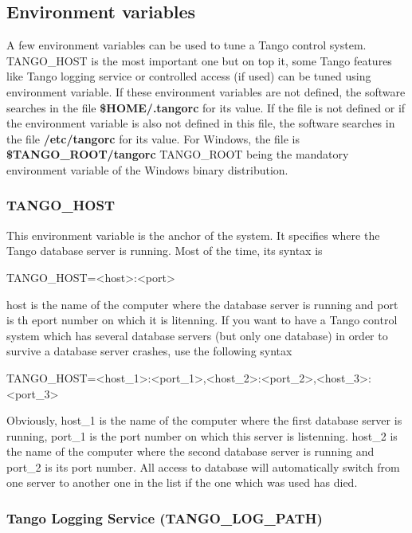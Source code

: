 \subsection{Environment variables}

A few environment variables can be used to tune a Tango control system.
TANGO\_HOST is the most important one but on top
it, some Tango features like Tango logging service or controlled access
(if used) can be tuned using environment variable. If these environment
variables are not defined, the software searches in the file \textbf{\$HOME/.tangorc}
for its value. If the file is not defined or if the environment variable
is also not defined in this file, the software searches in the file
\textbf{/etc/tangorc} for its value. For Windows,
the file is \textbf{\$TANGO\_ROOT/tangorc} TANGO\_ROOT
being the mandatory environment variable of the Windows binary distribution.


\subsubsection{TANGO\_HOST}

This environment variable is the anchor of the system. It specifies
where the Tango database server is running. Most of the time, its
syntax is\begin{center}TANGO\_HOST=<host>:<port>\end{center}host
is the name of the computer where the database server is running and
port is th eport number on which it is litenning. If you want to have
a Tango control system which has several database servers (but only
one database) in order to survive a database server crashes, use the
following syntax\begin{center}TANGO\_HOST=<host\_1>:<port\_1>,<host\_2>:<port\_2>,<host\_3>:<port\_3>\end{center}Obviously,
host\_1 is the name of the computer where the first database server
is running, port\_1 is the port number on which this server is listenning.
host\_2 is the name of the computer where the second database server
is running and port\_2 is its port number. All access to database
will automatically switch from one server to another one in the list
if the one which was used has died.


\subsubsection{Tango Logging Service (TANGO\_LOG\_PATH)}

